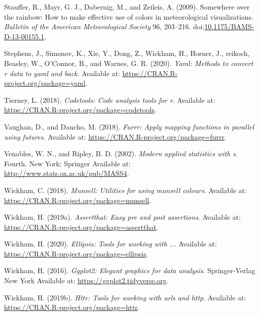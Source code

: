 \documentclass[utf8]{frontiersSCNS}
\begin{document}
\leavevmode\hypertarget{ref-stauffer2009somewhere}{}%
Stauffer, R., Mayr, G. J., Dabernig, M., and Zeileis, A. (2009).
Somewhere over the rainbow: How to make effective use of colors in
meteorological visualizations. \emph{Bulletin of the American
Meteorological Society} 96, 203--216.
doi:\href{https://doi.org/10.1175/BAMS-D-13-00155.1}{10.1175/BAMS-D-13-00155.1}.

\leavevmode\hypertarget{ref-stephens2020yaml}{}%
Stephens, J., Simonov, K., Xie, Y., Dong, Z., Wickham, H., Horner, J.,
reikoch, Beasley, W., O'Connor, B., and Warnes, G. R. (2020).
\emph{Yaml: Methods to convert r data to yaml and back}. Available at:
\url{https://CRAN.R-project.org/package=yaml}.

\leavevmode\hypertarget{ref-tierney2018codetools}{}%
Tierney, L. (2018). \emph{Codetools: Code analysis tools for r}.
Available at: \url{https://CRAN.R-project.org/package=codetools}.

\leavevmode\hypertarget{ref-vaughan2018furrr}{}%
Vaughan, D., and Dancho, M. (2018). \emph{Furrr: Apply mapping functions
in parallel using futures}. Available at:
\url{https://CRAN.R-project.org/package=furrr}.

\leavevmode\hypertarget{ref-venables2002modern}{}%
Venables, W. N., and Ripley, B. D. (2002). \emph{Modern applied
statistics with s}. Fourth. New York: Springer Available at:
\url{http://www.stats.ox.ac.uk/pub/MASS4}.

\leavevmode\hypertarget{ref-wickham2018munsell}{}%
Wickham, C. (2018). \emph{Munsell: Utilities for using munsell colours}.
Available at: \url{https://CRAN.R-project.org/package=munsell}.

\leavevmode\hypertarget{ref-wickham2019assertthat}{}%
Wickham, H. (2019a). \emph{Assertthat: Easy pre and post assertions}.
Available at: \url{https://CRAN.R-project.org/package=assertthat}.

\leavevmode\hypertarget{ref-wickham2020ellipsis}{}%
Wickham, H. (2020). \emph{Ellipsis: Tools for working with ...}
Available at: \url{https://CRAN.R-project.org/package=ellipsis}.

\leavevmode\hypertarget{ref-wickham2016ggplot2}{}%
Wickham, H. (2016). \emph{Ggplot2: Elegant graphics for data analysis}.
Springer-Verlag New York Available at:
\url{https://ggplot2.tidyverse.org}.

\leavevmode\hypertarget{ref-wickham2019httr}{}%
Wickham, H. (2019b). \emph{Httr: Tools for working with urls and http}.
Available at: \url{https://CRAN.R-project.org/package=httr}.
\end{document}
